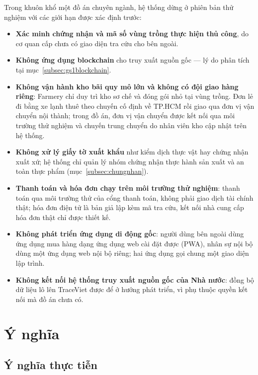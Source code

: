 Trong khuôn khổ một đồ án chuyên ngành, hệ thống dừng ở phiên bản thử nghiệm với các giới hạn được xác định trước:
\begin{itemize}
    \item \textbf{Xác minh chứng nhận và mã số vùng trồng thực hiện thủ công}, do cơ quan cấp chưa có giao diện tra cứu cho bên ngoài.
    \item \textbf{Không ứng dụng blockchain} cho truy xuất nguồn gốc --- lý do phân tích tại mục~\ref{subsec:gs1blockchain}.
    \item \textbf{Không vận hành kho bãi quy mô lớn và không có đội giao hàng riêng}: Farmery chỉ duy trì kho sơ chế và đóng gói nhỏ tại vùng trồng. Đơn lẻ đi bằng xe lạnh thuê theo chuyến cố định về TP.HCM rồi giao qua đơn vị vận chuyển nội thành; trong đồ án, đơn vị vận chuyển được kết nối qua môi trường thử nghiệm và chuyến trung chuyển do nhân viên kho cập nhật trên hệ thống.
    \item \textbf{Không xử lý giấy tờ xuất khẩu} như kiểm dịch thực vật hay chứng nhận xuất xứ; hệ thống chỉ quản lý nhóm chứng nhận thực hành sản xuất và an toàn thực phẩm (mục~\ref{subsec:chungnhan}).
    \item \textbf{Thanh toán và hóa đơn chạy trên môi trường thử nghiệm}: thanh toán qua môi trường thử của cổng thanh toán, không phải giao dịch tài chính thật; hóa đơn điện tử là bản giả lập kèm mã tra cứu, kết nối nhà cung cấp hóa đơn thật chỉ được thiết kế.
    \item \textbf{Không phát triển ứng dụng di động gốc}: người dùng bên ngoài dùng ứng dụng mua hàng dạng ứng dụng web cài đặt được (PWA), nhân sự nội bộ dùng một ứng dụng web nội bộ riêng; hai ứng dụng gọi chung một giao diện lập trình.
    \item \textbf{Không kết nối hệ thống truy xuất nguồn gốc của Nhà nước}: đồng bộ dữ liệu lô lên TraceViet được để ở hướng phát triển, vì phụ thuộc quyền kết nối mà đồ án chưa có.
\end{itemize}

\section{Ý nghĩa}
\label{sec:ynghia}

\subsection{Ý nghĩa thực tiễn}

